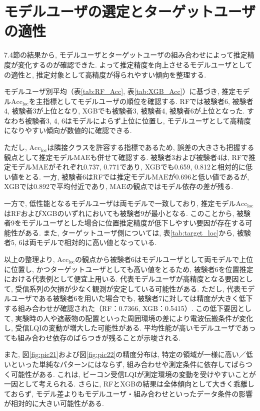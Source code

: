 \documentclass[a4paper,12pt]{jreport}
\begin{document}
\section{モデルユーザの選定とターゲットユーザの適性}
7.4節の結果から, モデルユーザとターゲットユーザの組み合わせによって推定精度が変化するのが確認できた. よって推定精度を向上させるモデルユーザとしての適性と, 推定対象として高精度が得られやすい傾向を整理する.

モデルユーザ別平均（表\ref{tab:RF_Acc}, 表\ref{tab:XGB_Acc}）に基づき, 推定モデル$\mathrm{Acc}_{\mathrm{loc}}$を主指標としてモデルユーザの順位を確認する. RFでは被験者6, 被験者4, 被験者3が上位となり, XGBでも被験者3, 被験者4, 被験者6が上位となった. すなわち被験者3, 4, 6はモデルによらず上位に位置し, モデルユーザとして高精度になりやすい傾向が数値的に確認できる.

ただし, $\mathrm{Acc}_{\mathrm{loc}}$は隣接クラスを許容する指標であるため, 誤差の大きさも把握する観点として推定モデル$\mathrm{MAE}$も併せて確認する. 被験者3および被験者4は, RFで推定モデル$\mathrm{MAE}$がそれぞれ0.737, 0.771であり, XGBでも0.659, 0.812と相対的に低い値をとる. 一方, 被験者6はRFでは推定モデル$\mathrm{MAE}$が0.696と低い値であるが, XGBでは0.892で平均付近であり, $\mathrm{MAE}$の観点ではモデル依存の差が残る.

一方で, 低性能となるモデルユーザは両モデルで一致しており, 推定モデル$\mathrm{Acc}_{\mathrm{loc}}$はRFおよびXGBのいずれにおいても被験者9が最小となる. このことから, 被験者9をモデルユーザとした場合に位置推定精度が低下しやすい要因が存在する可能性がある. また, ターゲットユーザ側については, 表\ref{tab:target_loc}から, 被験者5, 6は両モデルで相対的に高い値となっている.

以上の整理より, $\mathrm{Acc}_{\mathrm{loc}}$の観点から被験者6はモデルユーザとして両モデルで上位に位置し, かつターゲットユーザとしても高い値をとるため, 被験者6を位置推定における代表例として便宜上用いる. 代表モデルユーザが高精度となる要因として, 受信系列の欠損が少なく観測が安定している可能性がある. ただし, 代表モデルユーザである被験者6を用いた場合でも, 被験者7に対しては精度が大きく低下する組み合わせが確認された（RF：0.7366, XGB：0.5415）. この低下要因として, 実験時の人や遮蔽物の配置といった周囲環境の差により電波伝搬条件が変化し, 受信LQIの変動が増大した可能性がある. 平均性能が高いモデルユーザであっても組み合わせ依存のばらつきが残ることが示唆される.

また, 図\ref{fig:pic21}および図\ref{fig:pic22}の精度分布は, 特定の領域が一様に高い／低いといった単純なパターンにはならず, 組み合わせや測定条件に依存してばらつく可能性がある. これは, ビーコン受信LQIが測定環境の変動を受けやすいことが一因として考えられる. さらに, RFとXGBの結果は全体傾向として大きく乖離しておらず, モデル差よりもモデルユーザ・組み合わせといったデータ条件の影響が相対的に大きい可能性がある.
\end{document}

